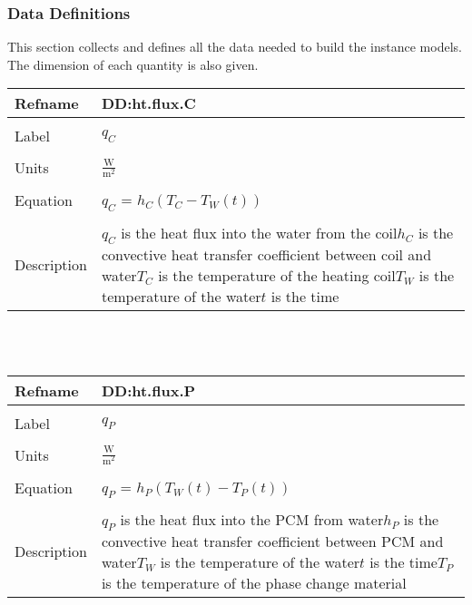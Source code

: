 \documentclass[12pt]{article}
\begin{document}
\subsubsection{Data Definitions}
\label{Sec:DataDefi}
This section collects and defines all the data needed to build the instance models. The dimension of each quantity is also given.
~\newline
\noindent \begin{minipage}{\textwidth}
\begin{tabular}{p{} p{}}
\toprule \textbf{Refname} & \textbf{DD:ht.flux.C}
\label{DD:ht.flux.C}
\\ \midrule \\
Label & $q_{C}$
\\ \midrule \\
Units & $\frac{\text{W}}{\text{m}^{2}}$
\\ \midrule \\
Equation & $q_{C}$ = $h_{C}\left(T_{C}-T_{W}\left(t\right)\right)$
\\ \midrule \\
Description & $q_{C}$ is the heat flux into the water from the coil\newline$h_{C}$ is the convective heat transfer coefficient between coil and water\newline$T_{C}$ is the temperature of the heating coil\newline$T_{W}$ is the temperature of the water\newline$t$ is the time
\\ \bottomrule \end{tabular}
\end{minipage}\\
~\newline
\noindent \begin{minipage}{\textwidth}
\begin{tabular}{p{} p{}}
\toprule \textbf{Refname} & \textbf{DD:ht.flux.P}
\label{DD:ht.flux.P}
\\ \midrule \\
Label & $q_{P}$
\\ \midrule \\
Units & $\frac{\text{W}}{\text{m}^{2}}$
\\ \midrule \\
Equation & $q_{P}$ = $h_{P}\left(T_{W}\left(t\right)-T_{P}\left(t\right)\right)$
\\ \midrule \\
Description & $q_{P}$ is the heat flux into the PCM from water\newline$h_{P}$ is the convective heat transfer coefficient between PCM and water\newline$T_{W}$ is the temperature of the water\newline$t$ is the time\newline$T_{P}$ is the temperature of the phase change material
\\ \bottomrule \end{tabular}
\end{minipage}\\
\end{document}
